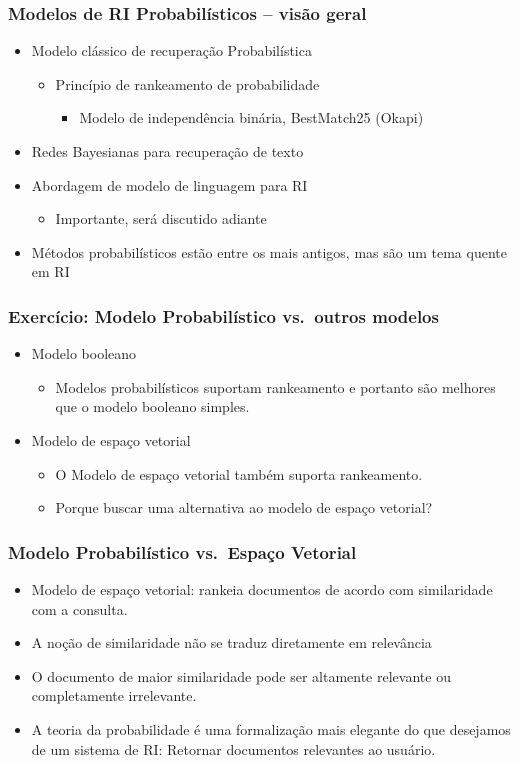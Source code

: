 \documentclass[compress]{beamer}
\begin{document}
\begin{frame}[<+->]
\frametitle{Modelos de RI Probabilísticos -- visão geral}
\pause[2]
\begin{itemize}
\item Modelo clássico de recuperação Probabilística
\begin{itemize}
\item Princípio de rankeamento de probabilidade
\begin{itemize}
\item Modelo de independência binária, BestMatch25 (Okapi)
\end{itemize}
\end{itemize}
\item Redes Bayesianas para recuperação de texto
\item Abordagem de modelo de linguagem para RI
\begin{itemize}
  \item Importante, será discutido adiante
\end{itemize}
\item Métodos probabilísticos estão entre os mais antigos, mas são um tema quente em RI
\end{itemize}
\end{frame}





\begin{frame}[<+->]
\frametitle{Exercício: Modelo Probabilístico vs.\ outros modelos}
\pause[2]
\begin{itemize}
\item Modelo booleano
\begin{itemize}
\item Modelos probabilísticos suportam rankeamento e portanto são melhores que o modelo booleano simples.
\end{itemize}
\item Modelo de espaço vetorial
\begin{itemize}
\item O Modelo de espaço vetorial também suporta rankeamento.
\item Porque buscar uma alternativa ao modelo de espaço vetorial?
\end{itemize}
\end{itemize}
\end{frame}

\begin{frame}[<+->]
\frametitle{Modelo Probabilístico vs.\ Espaço Vetorial}
\pause[2]
\begin{itemize}
\item Modelo de espaço vetorial: rankeia documentos de acordo com similaridade com a consulta.
\item A noção de similaridade não se traduz diretamente em relevância
\item O documento de maior similaridade pode ser altamente relevante ou completamente irrelevante.
\item A teoria da probabilidade é uma formalização mais elegante do que desejamos de um sistema de RI: Retornar documentos relevantes ao usuário.
\end{itemize}
\end{frame}
\end{document}
